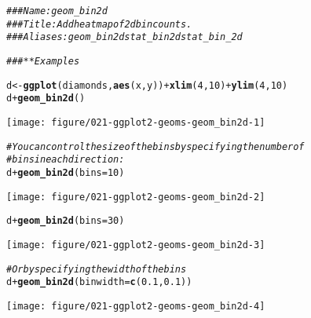 \documentclass[a4paper,titlepage]{tufte-handout}\usepackage[]{graphicx}\usepackage[]{color}
\makeatletter
\def\maxwidth{ %
  \ifdim\Gin@nat@width>\linewidth
    \linewidth
  \else
    \Gin@nat@width
  \fi
}
\newcommand{\hlnum}[1]{\textcolor[rgb]{0.686,0.059,0.569}{#1}}%
\newcommand{\hlcom}[1]{\textcolor[rgb]{0.678,0.584,0.686}{\textit{#1}}}%
\newcommand{\hlopt}[1]{\textcolor[rgb]{0,0,0}{#1}}%
\newcommand{\hlstd}[1]{\textcolor[rgb]{0.345,0.345,0.345}{#1}}%
\newcommand{\hlkwb}[1]{\textcolor[rgb]{0.69,0.353,0.396}{#1}}%
\newcommand{\hlkwc}[1]{\textcolor[rgb]{0.333,0.667,0.333}{#1}}%
\newcommand{\hlkwd}[1]{\textcolor[rgb]{0.737,0.353,0.396}{\textbf{#1}}}%
\newenvironment{kframe}{%
 \def\at@end@of@kframe{}%
 \ifinner\ifhmode%
  \def\at@end@of@kframe{\end{minipage}}%
  \begin{minipage}{\columnwidth}%
 \fi\fi%
 \def\FrameCommand##1{\hskip\@totalleftmargin \hskip-\fboxsep
 \colorbox{shadecolor}{##1}\hskip-\fboxsep
     \hskip-\linewidth \hskip-\@totalleftmargin \hskip\columnwidth}%
 \MakeFramed {\advance\hsize-\width
   \@totalleftmargin\z@ \linewidth\hsize
   \@setminipage}}%
 {\par\unskip\endMakeFramed%
 \at@end@of@kframe}
\newenvironment{knitrout}{}{} %
\makeatother
\begin{document}
\begin{knitrout}
\color{fgcolor}\begin{kframe}
\begin{alltt}
\hlcom{### Name: geom_bin2d}
\hlcom{### Title: Add heatmap of 2d bin counts.}
\hlcom{### Aliases: geom_bin2d stat_bin2d stat_bin_2d}

\hlcom{### ** Examples}

\hlstd{d} \hlkwb{<-} \hlkwd{ggplot}\hlstd{(diamonds,} \hlkwd{aes}\hlstd{(x, y))} \hlopt{+} \hlkwd{xlim}\hlstd{(}\hlnum{4}\hlstd{,} \hlnum{10}\hlstd{)} \hlopt{+} \hlkwd{ylim}\hlstd{(}\hlnum{4}\hlstd{,} \hlnum{10}\hlstd{)}
\hlstd{d} \hlopt{+} \hlkwd{geom_bin2d}\hlstd{()}
\end{alltt}


{\ttfamily\noindent\color{warningcolor}{\#\# Warning: Removed 478 rows containing non-finite values (stat\_bin2d).}}\end{kframe}
\texttt{[image: figure/021-ggplot2-geoms-geom\_bin2d-1]} 
\begin{kframe}\begin{alltt}
\hlcom{# You can control the size of the bins by specifying the number of}
\hlcom{# bins in each direction:}
\hlstd{d} \hlopt{+} \hlkwd{geom_bin2d}\hlstd{(}\hlkwc{bins} \hlstd{=} \hlnum{10}\hlstd{)}
\end{alltt}


{\ttfamily\noindent\color{warningcolor}{\#\# Warning: Removed 478 rows containing non-finite values (stat\_bin2d).}}

{\ttfamily\noindent\color{warningcolor}{\#\# Warning: Removed 4 rows containing missing values (geom\_tile).}}\end{kframe}
\texttt{[image: figure/021-ggplot2-geoms-geom\_bin2d-2]} 
\begin{kframe}\begin{alltt}
\hlstd{d} \hlopt{+} \hlkwd{geom_bin2d}\hlstd{(}\hlkwc{bins} \hlstd{=} \hlnum{30}\hlstd{)}
\end{alltt}


{\ttfamily\noindent\color{warningcolor}{\#\# Warning: Removed 478 rows containing non-finite values (stat\_bin2d).}}\end{kframe}
\texttt{[image: figure/021-ggplot2-geoms-geom\_bin2d-3]} 
\begin{kframe}\begin{alltt}
\hlcom{# Or by specifying the width of the bins}
\hlstd{d} \hlopt{+} \hlkwd{geom_bin2d}\hlstd{(}\hlkwc{binwidth} \hlstd{=} \hlkwd{c}\hlstd{(}\hlnum{0.1}\hlstd{,} \hlnum{0.1}\hlstd{))}
\end{alltt}


{\ttfamily\noindent\color{warningcolor}{\#\# Warning: Removed 478 rows containing non-finite values (stat\_bin2d).}}\end{kframe}
\texttt{[image: figure/021-ggplot2-geoms-geom\_bin2d-4]} 

\end{knitrout}
\end{document}

